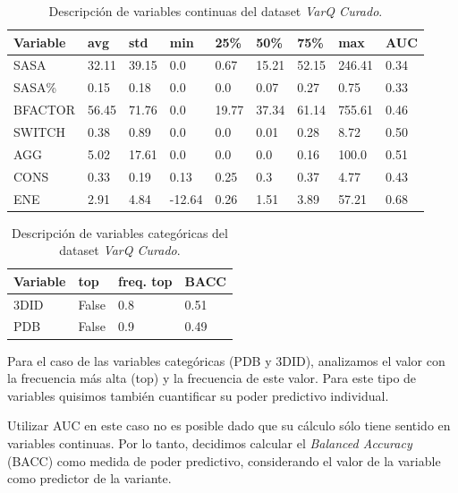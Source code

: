 \begin{table}[H]
\centering
\begin{tabular}{|l|l|l|l|l|l|l|l|l|}
\hline
Variable & avg  & std   & min    & 25\%  & 50\%  & 75\%  & max & AUC\\ \hline
SASA    & 32.11 & 39.15 & 0.0    & 0.67  & 15.21 & 52.15 & 246.41 & 0.34 \\ \hline
SASA\%  & 0.15  & 0.18  & 0.0    & 0.0   & 0.07  & 0.27  & 0.75 & 0.33  \\ \hline
BFACTOR & 56.45 & 71.76 & 0.0    & 19.77 & 37.34 & 61.14 & 755.61 & 0.46 \\ \hline
SWITCH  & 0.38  & 0.89  & 0.0    & 0.0   & 0.01  & 0.28  & 8.72 &  0.50  \\ \hline
AGG     & 5.02  & 17.61 & 0.0    & 0.0   & 0.0   & 0.16  & 100.0 &  0.51\\ \hline
CONS    & 0.33  & 0.19  & 0.13   & 0.25  & 0.3   & 0.37  & 4.77 & 0.43\\ \hline
ENE     & 2.91  & 4.84  & -12.64 & 0.26  & 1.51  & 3.89 & 57.21 & 0.68\\ \hline 
\end{tabular}
\caption{Descripción de variables continuas del dataset \textit{VarQ Curado}.}
\label{tab:descripcion_varq_cont}
\end{table}

\begin{table}[H]
\centering
\begin{tabular}{|l|l|l|l|}
\hline
Variable & top  & freq. top & BACC \\ \hline
3DID & False & 0.8 & 0.51\\ \hline
PDB  & False  & 0.9 & 0.49\\ \hline
\end{tabular}
\caption{Descripción de variables categóricas del dataset \textit{VarQ Curado}.}
\label{tab:descripcion_varq_cat}
\end{table}

Para el caso de las variables categóricas (PDB y 3DID), analizamos el valor con la frecuencia más alta (top) y la frecuencia de este valor. Para este tipo de variables quisimos también cuantificar su poder predictivo individual. 


Utilizar AUC en este caso no es posible dado que su cálculo sólo tiene sentido en variables continuas. Por lo tanto, decidimos calcular el \textit{Balanced Accuracy} (BACC) \cite{Brodersen2010} como medida de poder predictivo, considerando el valor de la variable como predictor de la variante. 

